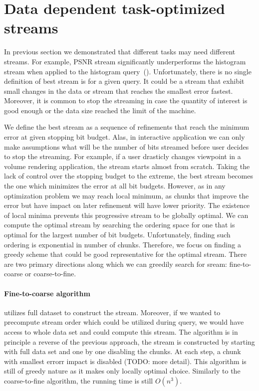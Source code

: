 \section{Data dependent task-optimized streams}
\label{sec:data_dep_streams}

In previous section we demonstrated that different tasks may need different streams. For example,
PSNR stream significantly underperforms the histogram stream when applied to the histogram
query~().
Unfortunately, there is no single definition of best stream is for a given query. It could be a stream that
exhibit small changes in the data or stream that reaches the smallest error fastest.
Moreover, it is common to stop the streaming in case the quantity of interest is good enough or the data size
reached the limit of the machine.

We define the best stream as
a sequence of refinements that reach the minimum error at given stopping bit budget. Alas, in interactive application
we can only make assumptions what will be the number of bits streamed before user decides to stop the streaming. For
example, if a user drasticly changes viewpoint in a volume rendering application, the stream starts almost from scratch.
Taking the lack of control over the stopping budget to the extreme, the best stream becomes the one which minimizes
the error at all bit budgets. However, as in any optimization problem we may reach local minimum, as
chunks that improve the error but have impact on later refinement will have lower priority. The existence of local
minima prevents this progressive stream to be globally optimal.
We can compute the optimal stream by searching the ordering space for one that is optimal for the largest number
of bit budgets. Unfortunately, finding such ordering is exponential in number of chunks. Therefore, we focus on
finding a greedy scheme that could be good representative for the optimal stream. There are two primary directions
along which we can greedily search for sream: fine-to-coarse or coarse-to-fine.

\paragraph*{Fine-to-coarse algorithm} utilizes full dataset to construct the stream.
Moreover,
if we wanted to precompute stream order which could be utilized during query, we would have access to whole
data set and could compute this stream. The algorithm is in principle a reverse of the previous approach, the
stream is constructed by starting with full data set and one by one disabling the chunks. At each step, a chunk
with smallest errorr impact is disabled (TODO: more detail). This algorithm is still of greedy nature as it
makes only locally optimal choice. Similarly to the coarse-to-fine algorithm, the running time is still $O(n^3)$.

